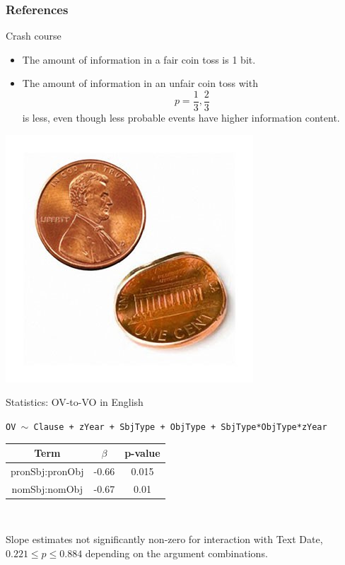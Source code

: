 \documentclass[hyperref={pdfpagelabels=false}]{beamer}
\begin{document}
\begin{frame}[allowframebreaks]
\frametitle{References}


\end{frame}


\begin{frame}{Crash course} 
	\begin{itemize}
		\item The amount of information in a fair coin toss is 1 bit.
		\item The amount of information in an unfair coin toss with $$p = \frac{1}{3}, \frac{2}{3}$$ is less, even though less probable events have higher information content.
	\end{itemize}
	\begin{center}
		\includegraphics[scale=0.4]{bentcoin.jpg}
	\end{center}
\end{frame}

\begin{frame}{Statistics: OV-to-VO in English} 
	
	\begin{center}
		\texttt{OV $\sim$ Clause + zYear + SbjType + ObjType + SbjType*ObjType*zYear}\\\vspace{5mm}

\begin{tabular}{c c c}
\textbf{Term} & \textbf{$\beta$} & \textbf{p-value} \\ \hline
pronSbj:pronObj & -0.66 & 0.015\\
nomSbj:nomObj & -0.67 & 0.01 \\

	
\end{tabular}\\\vspace{5mm}

	Slope estimates not significantly non-zero for interaction with Text Date, $ 0.221 \leq p \leq 0.884$ depending on the argument combinations.
\end{center}

\end{frame}
\end{document}

